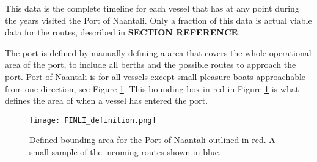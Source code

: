 \documentclass[../main.tex]{subfiles}
\begin{document}
This data is the complete timeline for each vessel that has at any point during the years visited the Port of Naantali. Only a fraction of this data is actual viable data for the routes, described in \textbf{SECTION REFERENCE}.

The port is defined by manually defining a area that covers the whole operational area of the port, to include all berths and the possible routes to approach the port. Port of Naantali is for all vessels except small pleasure boats approachable from one direction, see Figure \ref{fig:FINLI-box}. This bounding box in red in Figure \ref{fig:FINLI-box} is what defines the area of when a vessel has entered the port. 
\begin{figure}[H]
\centering
\texttt{[image: FINLI\_definition.png]}
\caption{Defined bounding area for the Port of Naantali outlined in red. A small sample of the incoming routes shown in blue.}
\label{fig:FINLI-box}
\end{figure}
\end{document}
